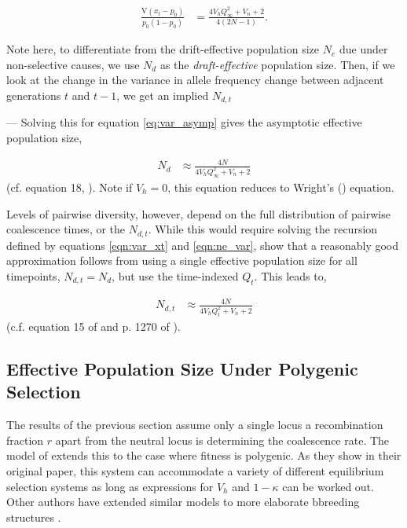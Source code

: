\documentclass[11pt]{article}
\newcommand{\V}{\text{V}}
\newcommand{\V}{\text{V}}
\begin{document}
\begin{align}
  \label{eq:var_asymp}
  \frac{\V(x_t - p_0)}{p_0(1-p_0)} &= \frac{4 V_h Q_\infty^2 +V_n+2}{4 (2 N-1)}.
\end{align}

Note here, to differentiate from the drift-effective population size $N_e$ due
under non-selective causes, we use $N_d$ as the \emph{draft-effective}
population size. Then, if we look at the change in the variance in allele
frequency change between adjacent generations $t$ and $t-1$, we get an implied
$N_{d,t}$

---
Solving this for equation \eqref{eq:var_asymp} gives the asymptotic effective
population size,

\begin{align}
  N_d &\approx \frac{4N}{4 V_h Q_\infty^2 +V_n+2}
\end{align}
%
(cf. equation 18, \cite{Santiago1995-hx}). Note if $V_h = 0$, this equation
reduces to Wright's (\citeyear{Wright1938-tv}) equation.

Levels of pairwise diversity, however, depend on the full distribution of
pairwise coalescence times, or the $N_{d,t}$. While this would require solving the
recursion defined by equations \eqref{eqn:var_xt} and \eqref{eqn:ne_var},
\textcite{Santiago1998-bs} show that a reasonably good approximation follows
from using a single effective population size for all timepoints, $N_{d,t} =
N_d$, but use the time-indexed $Q_t$. This leads to,

\begin{align}
  \label{eq:ne_t}
  N_{d,t} &\approx \frac{4N}{4 V_h Q_t^2 +V_n+2}
\end{align}
%
(c.f. equation 15 of \cite{Santiago1995-hx} and p. 1270 of \cite{Santiago2016-mu}).

\subsection{Effective Population Size Under Polygenic Selection}
\label{supp:ne-polygenic}

The results of the previous section assume only a single locus a recombination
fraction $r$ apart from the neutral locus is determining the coalescence rate. The
model of \textcite{Santiago1998-bs} extends this to the case where fitness is
polygenic. As they show in their original paper, this system can accommodate a
variety of different equilibrium selection systems as long as expressions for
$V_h$ and $1-\kappa$ can be worked out. Other authors have extended similar models to
more elaborate bbreeding structures \parencite{Wray1990-zf,Woolliams1993-qo}.
\end{document}

